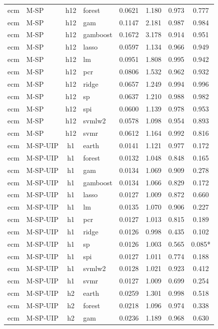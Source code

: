 \begin{ThreePartTable}
\begin{longtable}[t]{llclcccc}
ecm & M-SP & h12 & forest & 0.0621 & 1.180 & 0.973 & 0.777\\
ecm & M-SP & h12 & gam & 0.1147 & 2.181 & 0.987 & 0.984\\
ecm & M-SP & h12 & gamboost & 0.1672 & 3.178 & 0.914 & 0.951\\
ecm & M-SP & h12 & lasso & 0.0597 & 1.134 & 0.966 & 0.949\\
ecm & M-SP & h12 & lm & 0.0951 & 1.808 & 0.995 & 0.942\\
ecm & M-SP & h12 & pcr & 0.0806 & 1.532 & 0.962 & 0.932\\
ecm & M-SP & h12 & ridge & 0.0657 & 1.249 & 0.994 & 0.996\\
ecm & M-SP & h12 & sp & 0.0637 & 1.210 & 0.988 & 0.982\\
ecm & M-SP & h12 & spi & 0.0600 & 1.139 & 0.978 & 0.953\\
ecm & M-SP & h12 & svmlw2 & 0.0578 & 1.098 & 0.954 & 0.893\\
ecm & M-SP & h12 & svmr & 0.0612 & 1.164 & 0.992 & 0.816\\
\addlinespace
ecm & M-SP-UIP & h1 & earth & 0.0141 & 1.121 & 0.977 & 0.172\\
ecm & M-SP-UIP & h1 & forest & 0.0132 & 1.048 & 0.848 & 0.165\\
ecm & M-SP-UIP & h1 & gam & 0.0134 & 1.069 & 0.909 & 0.278\\
ecm & M-SP-UIP & h1 & gamboost & 0.0134 & 1.066 & 0.829 & 0.172\\
ecm & M-SP-UIP & h1 & lasso & 0.0127 & 1.009 & 0.872 & 0.660\\
ecm & M-SP-UIP & h1 & lm & 0.0135 & 1.070 & 0.906 & 0.227\\
ecm & M-SP-UIP & h1 & pcr & 0.0127 & 1.013 & 0.815 & 0.189\\
ecm & M-SP-UIP & h1 & ridge & 0.0126 & 0.998 & 0.435 & 0.102\\
ecm & M-SP-UIP & h1 & sp & 0.0126 & 1.003 & 0.565 & 0.085*\\
ecm & M-SP-UIP & h1 & spi & 0.0127 & 1.011 & 0.774 & 0.188\\
ecm & M-SP-UIP & h1 & svmlw2 & 0.0128 & 1.021 & 0.923 & 0.412\\
ecm & M-SP-UIP & h1 & svmr & 0.0127 & 1.009 & 0.699 & 0.254\\
\addlinespace
ecm & M-SP-UIP & h2 & earth & 0.0259 & 1.301 & 0.998 & 0.518\\
ecm & M-SP-UIP & h2 & forest & 0.0218 & 1.096 & 0.974 & 0.338\\
ecm & M-SP-UIP & h2 & gam & 0.0236 & 1.189 & 0.968 & 0.630\\

\end{longtable}
\end{ThreePartTable}

